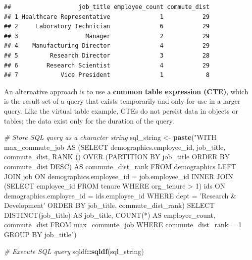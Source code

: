 \documentclass[]{book}
\newenvironment{Shaded}{\begin{snugshade}}{\end{snugshade}}
\newcommand{\CommentTok}[1]{\textcolor[rgb]{0.56,0.35,0.01}{\textit{#1}}}
\newcommand{\KeywordTok}[1]{\textcolor[rgb]{0.13,0.29,0.53}{\textbf{#1}}}
\newcommand{\NormalTok}[1]{#1}
\newcommand{\OperatorTok}[1]{\textcolor[rgb]{0.81,0.36,0.00}{\textbf{#1}}}
\newcommand{\StringTok}[1]{\textcolor[rgb]{0.31,0.60,0.02}{#1}}
\begin{document}
\begin{verbatim}
##                   job_title employee_count commute_dist
## 1 Healthcare Representative              1           29
## 2     Laboratory Technician              6           29
## 3                   Manager              2           29
## 4    Manufacturing Director              4           29
## 5         Research Director              3           28
## 6        Research Scientist              4           29
## 7            Vice President              1            8
\end{verbatim}

An alternative approach is to use a \textbf{common table expression (CTE)}, which is the result set of a query that exists temporarily and only for use in a larger query. Like the virtual table example, CTEs do not persist data in objects or tables; the data exist only for the duration of the query.

\begin{Shaded}
\begin{Highlighting}[]
\CommentTok{# Store SQL query as a character string}
\NormalTok{sql_string <-}\StringTok{ }\KeywordTok{paste}\NormalTok{(}\StringTok{"WITH max_commute_job}
\StringTok{                     AS}
\StringTok{                        (SELECT}
\StringTok{                          demographics.employee_id,}
\StringTok{                          job_title,}
\StringTok{                          commute_dist,}
\StringTok{                          RANK () OVER (PARTITION BY job_title ORDER BY commute_dist DESC) AS commute_dist_rank}
\StringTok{                        FROM}
\StringTok{                            demographics}
\StringTok{                          LEFT JOIN}
\StringTok{                            job}
\StringTok{                          ON}
\StringTok{                            demographics.employee_id = job.employee_id}
\StringTok{                          INNER JOIN}
\StringTok{                            (SELECT employee_id FROM tenure WHERE org_tenure > 1) ids}
\StringTok{                          ON}
\StringTok{                            demographics.employee_id = ids.employee_id}
\StringTok{                        WHERE}
\StringTok{                          dept = 'Research & Development'}
\StringTok{                        ORDER BY}
\StringTok{                          job_title,}
\StringTok{                          commute_dist_rank)}
\StringTok{                      }
\StringTok{                      SELECT}
\StringTok{                        DISTINCT(job_title) AS job_title,}
\StringTok{                        COUNT(*) AS employee_count,}
\StringTok{                        commute_dist}
\StringTok{                     FROM}
\StringTok{                        max_commute_job}
\StringTok{                      WHERE}
\StringTok{                        commute_dist_rank = 1}
\StringTok{                      GROUP BY}
\StringTok{                        job_title"}\NormalTok{)}

\CommentTok{# Execute SQL query}
\NormalTok{sqldf}\OperatorTok{::}\KeywordTok{sqldf}\NormalTok{(sql_string)}
\end{Highlighting}
\end{Shaded}
\end{document}
